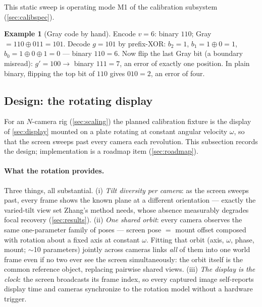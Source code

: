 \documentclass[11pt]{article}
\theoremstyle{definition}
\newtheorem{example}{Example}
\begin{document}
This static sweep is operating mode M1 of the calibration subsystem
(\autoref{sec:calibspec}).

\begin{example}[Gray code by hand]
\label{ex:gray}
Encode $v=6$: binary $110$; Gray $=110\oplus011=101$. Decode $g=101$ by
prefix-XOR: $b_2=1$, $b_1=1\oplus0=1$, $b_0=1\oplus0\oplus1=0$ ---
binary $110=6$. Now flip the last Gray bit (a boundary
misread): $g'=100\rightarrow$ binary $111=7$, an error of exactly one
position. In plain binary, flipping the top bit of $110$ gives $010=2$, an
error of four.
\end{example}

\subsection{Design: the rotating display}
\label{sec:rotating}

For an $N$-camera rig (\autoref{sec:scaling}) the planned calibration
fixture is the display of \autoref{sec:display} mounted on a plate rotating
at constant angular velocity $\omega$, so that the screen sweeps past every
camera each revolution. This subsection records the design; implementation
is a roadmap item (\autoref{sec:roadmap}).

\paragraph{What the rotation provides.} Three things, all substantial.
(i) \emph{Tilt diversity per camera}: as the screen sweeps past, every
frame shows the known plane at a different orientation --- exactly the
varied-tilt view set Zhang's method needs, whose absence measurably
degrades focal recovery (\autoref{sec:results}). (ii) \emph{One shared
orbit}: every camera observes the same one-parameter family of poses ---
screen pose $=$ mount offset composed with rotation about a fixed axis at
constant $\omega$. Fitting that orbit (axis, $\omega$, phase, mount;
$\sim$10 parameters) jointly across cameras links \emph{all} of them into
one world frame even if no two ever see the screen simultaneously: the
orbit itself is the common reference object, replacing pairwise shared
views. (iii) \emph{The display is the clock}: the screen broadcasts its
frame index, so every captured image self-reports display time and
cameras synchronize to the rotation model without a hardware trigger.
\end{document}
